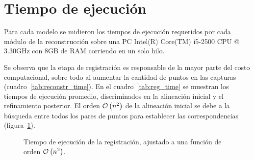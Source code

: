 
	\section{Tiempo de ejecución}
	Para cada modelo se midieron los tiempos de ejecución requeridos por cada módulo de la reconstrucción
	sobre una PC
	Intel(R) Core(TM) i5-2500 CPU @ 3.30GHz
	con 8GB de RAM
	corriendo en un solo hilo.

		Se observa que la etapa de registración
		es responsable de la mayor parte del costo computacional, sobre todo al aumentar
		la cantidad de puntos en las capturas (cuadro~\ref{tab:reconstr_time}).
		En el cuadro~\ref{tab:reg_time} se muestran
		los tiempos de ejecución promedio, discriminados en la alineación
		inicial y el refinamiento posterior.
		El orden $\mathcal{O}\left(n^2\right)$ de la alineación inicial se debe a la búsqueda
		entre todos los pares de puntos para establecer las correspondencias (figura~\ref{fig:registration_order}).
		

		

		\begin{figure}
			\centering
			
			\caption{\label{fig:registration_order}Tiempo de ejecución de la registración, ajustado a una función de orden $\mathcal{O}\left(n^2\right)$.}
		\end{figure}
